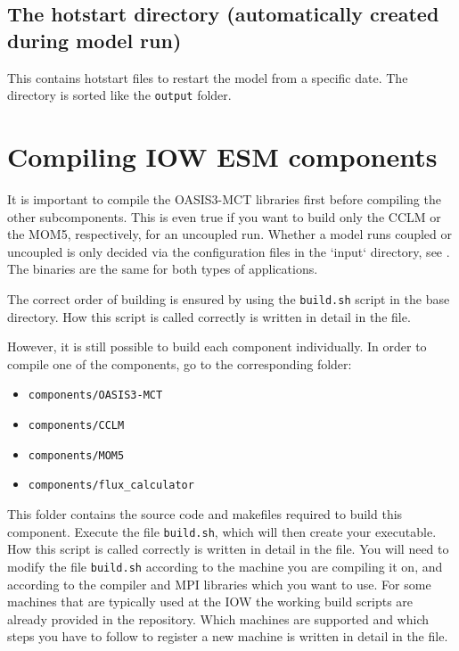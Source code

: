 \documentclass[a4paper,titlepage]{scrartcl}
\begin{document}
\subsection{The hotstart directory (automatically created during model run)}
This contains hotstart files to restart the model from a specific date.
The directory is sorted like the \texttt{output} folder.


\newpage
\section{Compiling IOW ESM components}

It is important to compile the OASIS3-MCT libraries first before compiling the other subcomponents.
This is even true if you want to build only the CCLM or the MOM5, respectively, for an uncoupled run.
Whether a model runs coupled or uncoupled is only decided via the configuration files in the `input` directory, see .
The binaries are the same for both types of applications.

The correct order of building is ensured by using the \texttt{build.sh} script in the base directory.
How this script is called correctly is written in detail in the \Readme file.

However, it is still possible to build each component individually.
In order to compile one of the components, go to the corresponding folder:
\begin{itemize}
\item \texttt{components/OASIS3-MCT}
\item \texttt{components/CCLM}
\item \texttt{components/MOM5}
\item \texttt{components/flux\_calculator}
\end{itemize}
This folder contains the source code and makefiles required to build this component.
Execute the file \texttt{build.sh}, which will then create your executable.
How this script is called correctly is written in detail in the \Readme file.
You will need to modify the file \texttt{build.sh} according to the machine you are compiling it on, and according to the compiler and MPI libraries which you want to use.
For some machines that are typically used at the IOW the working build scripts are already provided in the repository.
Which machines are supported and which steps you have to follow to register a new machine is written in detail in the \Readme file.
\end{document}
